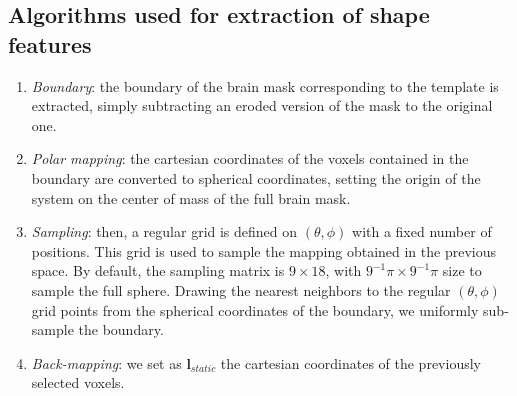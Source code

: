 \documentclass{frontiers}
\newcommand{\emitem}[1]{\item \emph{#1}}
\newcommand{\lm}[1]{\ensuremath{\mathbf{l}_{#1}}}
\newcounter{myalgorithm}
\newenvironment{myalgorithm}[1][]{%
  \begin{mdframed}[style=algstyle,frametitle={\refstepcounter{myalgorithm}Algorithm \themyalgorithm: #1}]%
}{%
  \end{mdframed}
}
\begin{document}
\subsection*{Algorithms used for extraction of shape features}
\begin{myalgorithm}[Extraction of static landmarks across the surface of the brain\label{alg:lstatic}]
\begin{enumerate}
\emitem{Boundary}: the boundary of the brain mask corresponding to the template is
  extracted, simply subtracting an eroded version of the mask to the original one.
\emitem{Polar mapping}: the cartesian coordinates of the voxels contained in the boundary
  are converted to spherical coordinates, setting the origin of the system on the center
  of mass of the full brain mask.
\emitem{Sampling}: then, a regular grid is defined on $(\theta,\phi)$ with a fixed number
  of positions. This grid is used to sample the mapping obtained in the previous space.
  By default, the sampling matrix is $9\times18$, with $9^{-1}\pi \times 9^{-1}\pi$ size
  to sample the full sphere.
  Drawing the nearest neighbors to the regular $(\theta,\phi)$ grid points from the spherical
  coordinates of the boundary, we uniformly sub-sample the boundary.
\emitem{Back-mapping}: we set as \lm{static} the cartesian coordinates of the
  previously selected voxels.
\end{enumerate}
\end{myalgorithm}
\end{document}
